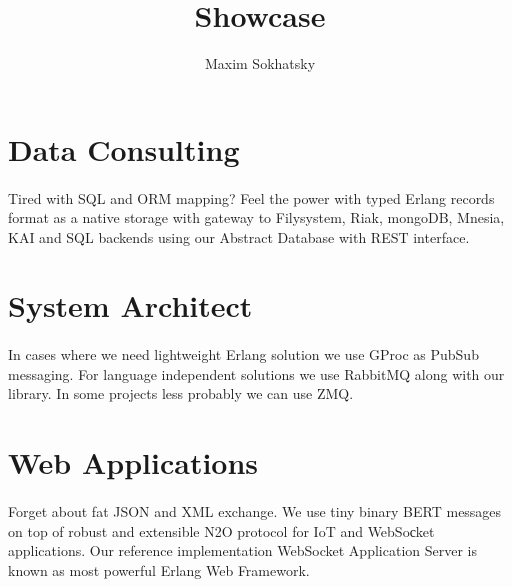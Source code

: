 \documentclass[11pt]{article}
\begin{document}
\title{Showcase}
\author{Maxim Sokhatsky}


\section*{Data Consulting}
\paragraph{}
    Tired with SQL and ORM mapping? Feel the power with typed Erlang
    records format as a native storage with gateway to Filysystem,
    Riak, mongoDB, Mnesia, KAI and SQL backends using our
     Abstract Database with REST interface.

\section*{System Architect}
\paragraph{}
    In cases where we need lightweight Erlang solution we use GProc as PubSub messaging.
    For language independent solutions we use RabbitMQ along with our  library.
    In some projects less probably we can use ZMQ.

\section*{Web Applications}
\paragraph{}
    Forget about fat JSON and XML exchange.
    We use tiny binary BERT messages on top of robust and extensible
    N2O protocol for IoT and WebSoсket applications.
    Our reference implementation  WebSocket Application Server is known as most powerful Erlang Web Framework.
\end{document}
